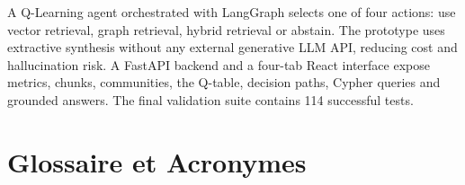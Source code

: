 \documentclass[12pt,a4paper,oneside]{report}
\begin{document}
A Q-Learning agent orchestrated with LangGraph selects one of four actions: use vector retrieval, graph retrieval, hybrid retrieval or abstain. The prototype uses extractive synthesis without any external generative LLM API, reducing cost and hallucination risk. A FastAPI backend and a four-tab React interface expose metrics, chunks, communities, the Q-table, decision paths, Cypher queries and grounded answers. The final validation suite contains 114 successful tests.

\clearpage
\tableofcontents
\clearpage
\listoffigures
{}
\clearpage
\listoftables
{}
\clearpage

\chapter*{Glossaire et Acronymes}
\end{document}
